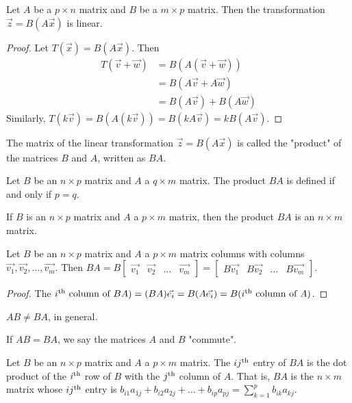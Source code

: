 \documentclass[a4paper,11pt]{article}
\begin{document}
\begin{outline}
    Let \(A\) be a \(p \times n\) matrix and \(B\) be a \(m \times p\) matrix. Then the transformation
    \(\vec{z} = B(A\vec{x})\) is linear.
    
    \begin{proof}
      Let \(T(\vec{x}) = B(A\vec{x})\). Then
      \begin{align*}
        T(\vec{v}+\vec{w}) &= B(A(\vec{v}+\vec{w}))     \\
                           &= B(A\vec{v}+A\vec{w})      \\
                           &= B(A\vec{v}) + B(A\vec{w})
      \end{align*}
      Similarly, \(T(k\vec{v}) = B(A(k\vec{v})) = B(kA\vec{v}) = kB(A\vec{v})\).
    \end{proof}
    
    The matrix of the linear transformation \(\vec{z} = B(A\vec{x})\) is called the "product" of the matrices \(B\)
    and \(A\), written as \(BA\).
    
    Let \(B\) be an \(n \times p\) matrix and \(A\) a \(q \times m\) matrix. The product \(BA\) is defined
    if and only if \(p = q\).
    
    If \(B\) is an \(n \times p\) matrix and \(A\) a \(p \times m\) matrix, then the product \(BA\) is
    an \(n \times m\) matrix.
    
    Let \(B\) be an \(n \times p\) matrix and \(A\) a \(p \times m\) matrix columns with columns
    \(\vec{v_1}, \vec{v_2}, \ldots, \vec{v_m}\). Then \(BA = B\begin{bmatrix} \vec{v_1} & \vec{v_2} & \ldots
    & \vec{v_m}\end{bmatrix} = \begin{bmatrix} B\vec{v_1} & B\vec{v_2} & \ldots & B\vec{v_m}\end{bmatrix}\).
    
    \begin{proof}
      The \(i\textsuperscript{th} \text{ column of } BA) = (BA)\vec{e_i} = B(A\vec{e_i}) = B(i\textsuperscript{th}
      \text{ column of } A)\).
    \end{proof}
    
    \(AB \neq BA\), in general.
    
    If \(AB = BA\), we say the matrices \(A\) and \(B\) "commute".
    
    Let \(B\) be an \(n \times p\) matrix and \(A\) a \(p \times m\) matrix. The \(ij\textsuperscript{th}\) entry
    of \(BA\) is the dot product of the \(i\textsuperscript{th}\) row of \(B\) with the \(j\textsuperscript{th}\) column
    of \(A\). That is, \(BA\) is the \(n \times m\) matrix whose \(ij\textsuperscript{th}\) entry is \(b_{i1}a_{1j} +
    b_{i2}a_{2j} + \ldots + b_{ip}a_{pj} = \sum_{k=1}^p b_{ik}a_{kj}\).
    

\end{outline}
\end{document}
